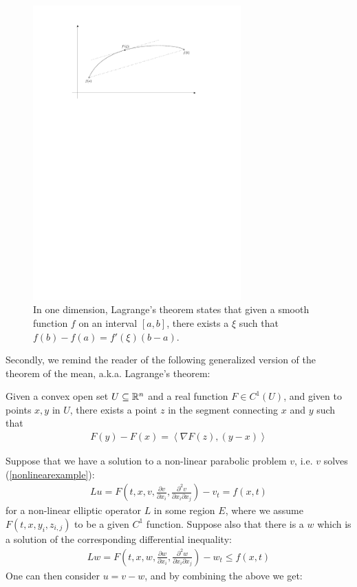 \begin{figure}
\centering
\includegraphics[width=0.713\textwidth]{figures/4_Lagrange_theorem}
\caption{In one dimension, Lagrange's theorem states that given a smooth function $f$ on an interval $[a, b]$, there exists a $\xi$ such that $f(b)-f(a) = f'(\xi) (b-a)$.}
\end{figure}
Secondly, we remind the reader of the following generalized version of the theorem of the mean, a.k.a. Lagrange's theorem:
\begin{theorem}
	Given a convex open set $U\subseteq \mathbb{R}^n$ and a real function $F \in C^1(U)$, and given to points $x, y$ in $U$, there exists a point $z$ in the segment connecting $x$ and $y$ such that 
	\begin{align*}
		F(y)-F(x) =\left\langle \nabla F(z), (y-x) \right\rangle 
	\end{align*}
\end{theorem}
Suppose that we have a solution to a non-linear parabolic problem $v$, i.e. $v$ solves (\ref{nonlinearexample}):
\begin{align*}
	Lu= F\left(t, x, v, \frac{\partial v}{\partial x_i} , \frac{\partial^2 v}{\partial x_i \partial x_j}\right)-v_t = f(x, t)
\end{align*}
for a non-linear elliptic operator $L$ in some region $E$, where we assume $F(t, x, y_i, z_{i,j})$ to be a given $C^1$ function. Suppose also that there is a $w$ which is a solution of the corresponding differential inequality:
\begin{align*}
	Lw= F\left(t, x, w, \frac{\partial w}{\partial x_i} , \frac{\partial^2 w}{\partial x_i \partial x_j}\right)-w_t \leq f(x, t)
\end{align*}
One can then consider $u = v-w$, and by combining the above we get: 

